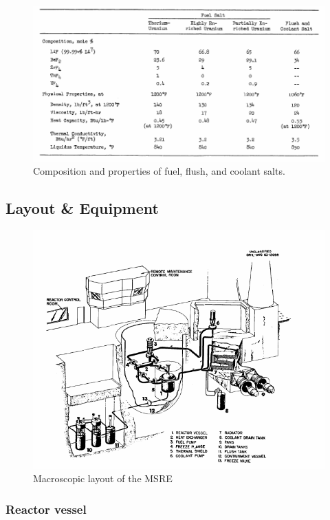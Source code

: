 \documentclass{article}
\begin{document}
\begin{figure}[htpb]
  \centering
  \includegraphics[width=\textwidth]{salt_properties.png}
  \caption{Composition and properties of fuel, flush, and coolant
    salts. \cite{robertson_msre_1965}}
  \label{fig:salt_properties}
\end{figure}

\subsection{Layout \& Equipment}

\begin{figure}[htpb]
  \centering
  \includegraphics{flow_diagram.png}
  \caption{Macroscopic layout of the MSRE \cite{robertson_msre_1965}}
  \label{fig:MSRE_layout}
\end{figure}

\subsubsection{Reactor vessel}
\end{document}
